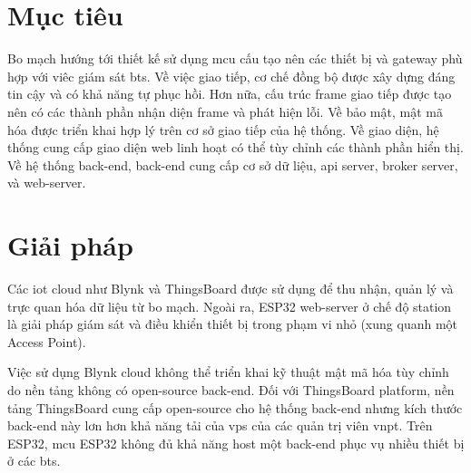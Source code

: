 \section{Mục tiêu}

Bo mạch hướng tới thiết kế sử dụng \acrfull{mcu} cấu tạo nên các thiết bị và gateway phù hợp với viêc giám sát \acrshort{bts}. Về việc giao tiếp, cơ chế đồng bộ được xây dựng đáng tin cậy và có khả năng tự phục hồi. Hơn nữa, cấu trúc frame giao tiếp được tạo nên có các thành phần nhận diện frame và phát hiện lỗi. Về bảo mật, mật mã hóa được triển khai hợp lý trên cơ sở giao tiếp của hệ thống. Về giao diện, hệ thống cung cấp giao diện web linh hoạt có thể tùy chỉnh các thành phần hiển thị. Về hệ thống back-end, back-end cung cấp cơ sở dữ liệu, \acrshort{api} server, broker server, và web-server.

\section{Giải pháp}

Các \acrshort{iot} cloud như Blynk và ThingsBoard được sử dụng để thu nhận, quản lý và trực quan hóa dữ liệu từ bo mạch. Ngoài ra, ESP32 web-server ở chế độ station là giải pháp giám sát và điều khiển thiết bị trong phạm vi nhỏ (xung quanh một Access Point).

Việc sử dụng Blynk cloud không thể triển khai kỹ thuật mật mã hóa tùy chỉnh do nền tảng không có open-source back-end. Đối với ThingsBoard platform, nền tảng ThingsBoard cung cấp open-source cho hệ thống back-end nhưng kích thước back-end này lơn hơn khả năng tải của \acrshort{vps} của các quản trị viên \acrshort{vnpt}. Trên ESP32, \acrshort{mcu} ESP32 không đủ khả năng host một back-end phục vụ nhiều thiết bị ở các \acrshort{bts}.

